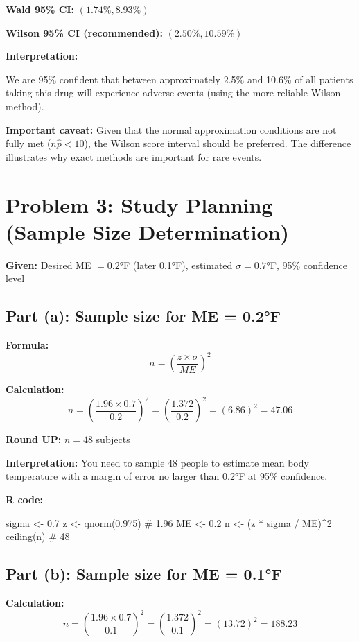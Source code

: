 \documentclass[11pt]{article}
\begin{document}
\textbf{Wald 95\% CI:} $(1.74\%, 8.93\%)$

\textbf{Wilson 95\% CI (recommended):} $(2.50\%, 10.59\%)$

\textbf{Interpretation:}

We are 95\% confident that between approximately 2.5\% and 10.6\% of all patients taking this drug will experience adverse events (using the more reliable Wilson method).

\textbf{Important caveat:} Given that the normal approximation conditions are not fully met ($n\hat{p} < 10$), the Wilson score interval should be preferred. The difference illustrates why exact methods are important for rare events.

\vspace{12pt}

\section*{Problem 3: Study Planning (Sample Size Determination)}

\textbf{Given:} Desired ME $= 0.2$°F (later 0.1°F), estimated $\sigma = 0.7$°F, 95\% confidence level

\subsection*{Part (a): Sample size for ME = 0.2°F}

\textbf{Formula:}
$$n = \left(\frac{z \times \sigma}{ME}\right)^2$$

\textbf{Calculation:}
$$n = \left(\frac{1.96 \times 0.7}{0.2}\right)^2 = \left(\frac{1.372}{0.2}\right)^2 = (6.86)^2 = 47.06$$

\textbf{Round UP:} $n = \boxed{48}$ subjects

\textbf{Interpretation:} You need to sample 48 people to estimate mean body temperature with a margin of error no larger than 0.2°F at 95\% confidence.

\textbf{R code:}
\begin{rcode}
sigma <- 0.7
z <- qnorm(0.975)  # 1.96
ME <- 0.2
n <- (z * sigma / ME)^2
ceiling(n)  # 48
\end{rcode}

\subsection*{Part (b): Sample size for ME = 0.1°F}

\textbf{Calculation:}
$$n = \left(\frac{1.96 \times 0.7}{0.1}\right)^2 = \left(\frac{1.372}{0.1}\right)^2 = (13.72)^2 = 188.23$$
\end{document}
